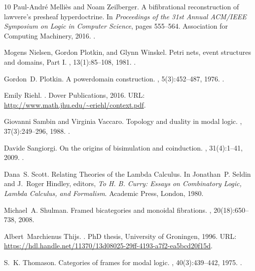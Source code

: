 \documentclass[10pt,a4paper]{article}
\begin{document}
\begin{thebibliography}{10}
Paul-André Melliès and Noam Zeilberger.
\newblock A bifibrational reconstruction of lawvere's presheaf hyperdoctrine.
\newblock In {\em Proceedings of the 31st Annual {ACM}/{IEEE} Symposium on
  Logic in Computer Science}, pages 555--564. Association for Computing
  Machinery, 2016.
\newblock \href {https://doi.org/10.1145/2933575.2934525}
  {}.

Mogens Nielsen, Gordon Plotkin, and Glynn Winskel.
\newblock Petri nets, event structures and domains, {Part I}.
, 13(1):85--108, 1981.
\newblock \href {https://doi.org/10.1016/0304-3975(81)90112-2}
  {}.

Gordon~D. Plotkin.
\newblock A powerdomain construction.
, 5(3):452--487, 1976.
\newblock \href {https://doi.org/10.1137/0205035} {}.

Emily Riehl.
.
\newblock Dover Publications, 2016.
\newblock URL: \url{http://www.math.jhu.edu/~eriehl/context.pdf}.

Giovanni Sambin and Virginia Vaccaro.
\newblock Topology and duality in modal logic.
, 37(3):249--296, 1988.
\newblock \href {https://doi.org/10.1016/0168-0072(88)90021-8}
  {}.

Davide Sangiorgi.
\newblock On the origins of bisimulation and coinduction.
,
  31(4):1--41, 2009.
\newblock \href {https://doi.org/10.1145/1516507.1516510}
  {}.

Dana~S. Scott.
\newblock Relating {Theories} of the {Lambda} {Calculus}.
\newblock In Jonathan~P. Seldin and J.~Roger Hindley, editors, {\em To {H}.
  {B}. {Curry}: {Essays} on {Combinatory} {Logic}, {Lambda} {Calculus}, and
  {Formalism}}. Academic Press, London, 1980.

Michael~A. Shulman.
\newblock Framed bicategories and monoidal fibrations.
, 20(18):650--738, 2008.

Albert~Marchienus Thijs.
.
\newblock PhD thesis, University of Groningen, 1996.
\newblock URL:
  \url{https://hdl.handle.net/11370/13d08025-29ff-4193-a7f2-ea5bcd20f15d}.

S.~K. Thomason.
\newblock Categories of frames for modal logic.
, 40(3):439--442, 1975.
\newblock \href {https://doi.org/10.2307/2272167} {}.

\end{thebibliography}
\end{document}
